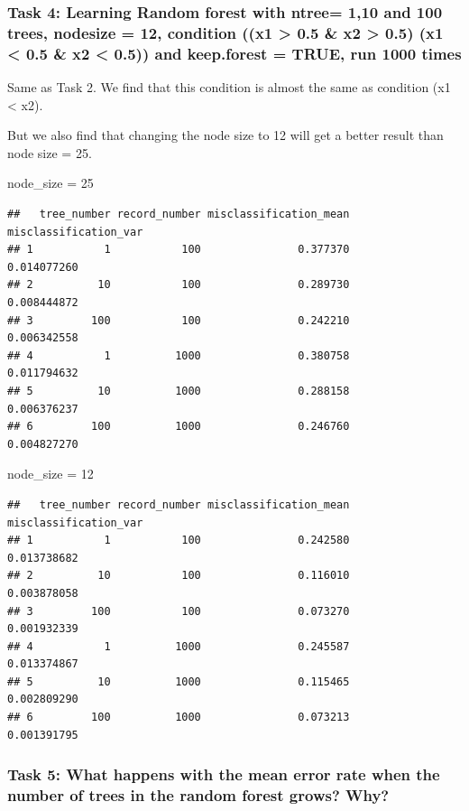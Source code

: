 \documentclass[
]{article}
\begin{document}
\hypertarget{task-4-learning-random-forest-with-ntree-110-and-100-trees-nodesize-12-condition-x1-0.5-x2-0.5-x1-0.5-x2-0.5-and-keep.forest-true-run-1000-times}{%
\subsubsection{Task 4: Learning Random forest with ntree= 1,10 and 100
trees, nodesize = 12, condition ((x1 \textgreater{} 0.5 \& x2
\textgreater{} 0.5) \textbar{} (x1 \textless{} 0.5 \& x2 \textless{}
0.5)) and keep.forest = TRUE, run 1000
times}\label{task-4-learning-random-forest-with-ntree-110-and-100-trees-nodesize-12-condition-x1-0.5-x2-0.5-x1-0.5-x2-0.5-and-keep.forest-true-run-1000-times}}

Same as Task 2. We find that this condition is almost the same as
condition (x1 \textless{} x2).

But we also find that changing the node size to 12 will get a better
result than node size = 25.

node\_size = 25

\begin{verbatim}
##   tree_number record_number misclassification_mean misclassification_var
## 1           1           100               0.377370           0.014077260
## 2          10           100               0.289730           0.008444872
## 3         100           100               0.242210           0.006342558
## 4           1          1000               0.380758           0.011794632
## 5          10          1000               0.288158           0.006376237
## 6         100          1000               0.246760           0.004827270
\end{verbatim}

node\_size = 12

\begin{verbatim}
##   tree_number record_number misclassification_mean misclassification_var
## 1           1           100               0.242580           0.013738682
## 2          10           100               0.116010           0.003878058
## 3         100           100               0.073270           0.001932339
## 4           1          1000               0.245587           0.013374867
## 5          10          1000               0.115465           0.002809290
## 6         100          1000               0.073213           0.001391795
\end{verbatim}

\hypertarget{task-5-what-happens-with-the-mean-error-rate-when-the-number-of-trees-in-the-random-forest-grows-why}{%
\subsubsection{Task 5: What happens with the mean error rate when the
number of trees in the random forest grows?
Why?}\label{task-5-what-happens-with-the-mean-error-rate-when-the-number-of-trees-in-the-random-forest-grows-why}}
\end{document}
